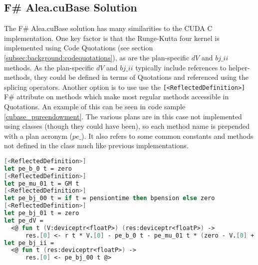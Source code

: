 \subsection{F\# Alea.cuBase Solution}
The F\# Alea.cuBase solution has many similarities to the CUDA C implementation.
One key factor is that the Runge-Kutta four kernel is implemented using Code Quotations (see section \ref{subsec:background:codequotations}), as are the plan-specific $dV$ and $bj\_ii$ methods.
As the plan-specific $dV$ and $bj\_ii$ typically include references to helper-methods, they could be defined in terms of Quotations and referenced using the splicing operators.
Another option is to use use the \lstinline$[<ReflectedDefinition>]$ F\# attribute on methods which make most regular methods accessible in Quotations.
An example of this can be seen in code sample \ref{cubase_pureendowment}. 
The various plans are in this case not implemented using classes (though they could have been), so each method name is prepended with a plan acronym ($pe\_$).
It also refers to some common constants and methods not defined in the class much like previous implementations.
\begin{lstlisting}[language=FSharp, caption=The pure endowment insurance plan expressed in F\# Alea.cuBase, label=cubase_pureendowment]
[<ReflectedDefinition>] 
let pe_b_0 t = zero
[<ReflectedDefinition>]
let pe_mu_01 t = GM t
[<ReflectedDefinition>]
let pe_bj_00 t = if t = pensiontime then bpension else zero
[<ReflectedDefinition>]
let pe_bj_01 t = zero
let pe_dV = 
  <@ fun t (V:deviceptr<floatP>) (res:deviceptr<floatP>) -> 
      res.[0] <- r t * V.[0] - pe_b_0 t - pe_mu_01 t * (zero - V.[0] + pe_bj_01 t) @>
let pe_bj_ii = 
  <@ fun t (res:deviceptr<floatP>) ->
      res.[0] <- pe_bj_00 t @>
\end{lstlisting}

